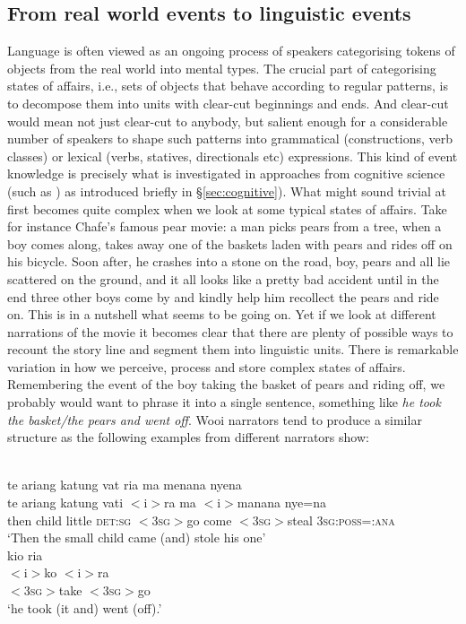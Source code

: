 \subsection{From real world events to linguistic events}\label{sec:real-world-linguistic-events}

Language is often viewed as an ongoing process of speakers categorising tokens of objects from the real world into mental types. The crucial part of categorising states of affairs, i.e., sets of objects that behave according to regular patterns, is to decompose them into units with clear-cut beginnings and ends. And clear-cut would mean not just clear-cut to anybody, but salient enough for a considerable number of speakers to shape such patterns into grammatical (constructions, verb classes) or lexical (verbs, statives, directionals etc) expressions. This kind of event knowledge \citep{Elman2009} is precisely what is investigated in approaches from cognitive science (such as \citealt{newtson1976perceptual, zacks2007event, zacks2010we}) as introduced briefly in §\ref{sec:cognitive}). What might sound trivial at first becomes quite complex when we look at some typical states of affairs. Take for instance Chafe's famous pear movie: a man picks pears from a tree, when a boy comes along, takes away one of the baskets laden with pears and rides off on his bicycle. Soon after, he crashes into a stone on the road, boy, pears and all lie scattered on the ground, and it all looks like a pretty bad accident until in the end three other boys come by and kindly help him recollect the pears and ride on. This is in a nutshell what seems to be going on. Yet if we look at different narrations of the movie it becomes clear that there are plenty of possible ways to recount the story line and segment them into linguistic units. There is remarkable variation in how we perceive, process and store complex states of affairs. Remembering the event of the boy taking the basket of pears and riding off, we probably would want to phrase it into a single sentence, something like \textit{he took the basket/the pears and went off}. Wooi narrators tend to produce a similar structure as the following examples from different narrators show:

\ea
{}\\
\ea
\glll te ariang katung vat ria ma menana nyena \\
te ariang katung vati $<$i$>$ra ma $<$i$>$manana nye=na \\
then child little \textsc{det}:\textsc{sg} $<$\textsc{3}\textsc{sg}$>$go come $<$\textsc{3}\textsc{sg}$>$steal \textsc{3}\textsc{sg}:\textsc{poss}=:\textsc{ana}\\
\glft `Then the small child came (and) stole his one'\\
\ex
\glll kio ria\\
$<$i$>$ko $<$i$>$ra \\
$<$\textsc{3}\textsc{sg}$>$take $<$\textsc{3}\textsc{sg}$>$go\\
\glft `he took (it and) went (off).'\\ 
\z
\z

